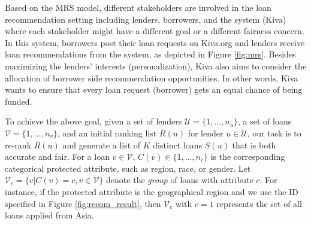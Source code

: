 


Based on the MRS model, different stakeholders are involved in the loan recommendation setting including lenders, borrowers, and the system (Kiva) where each stakeholder might have a different goal or a different fairness concern. In this system, borrowers post their loan requests on Kiva.org and lenders receive loan recommendations from the system, as depicted in Figure \ref{fig:mrs}. 
Besides maximizing the lenders' interests (personalization), Kiva also aims to consider the allocation of borrower side recommendation opportunities. In other words, Kiva wants to ensure that every loan request (borrower) gets an equal chance of being funded.



To achieve the above goal, given a set of lenders $\mathcal U=\{1,\ldots,n_u\}$, a set of loans $\mathcal V=\{1,\ldots,n_v\}$, and an initial ranking list $R(u)$ for lender $u\in \mathcal U$, our task is to re-rank $R(u)$ and generate a list of $K$ distinct loans $S(u)$ that is both accurate and fair. For a loan $v\in\mathcal V$, $C(v)\in\{1,\ldots,n_c\}$ is the corresponding categorical protected attribute, such as region, race, or gender. Let $\mathcal V_c=\{v|C(v)=c, v\in \mathcal V\}$ denote the \emph{group} of loans with attribute $c$. For instance, if the protected attribute is the geographical region and we use the ID specified in Figure \ref{fig:recom_result}, then $\mathcal V_c$ with $c=1$ represents the set of all loans applied from Asia.


